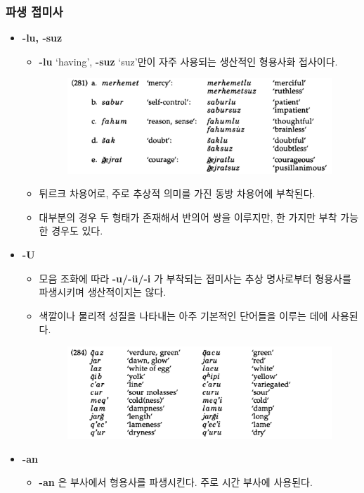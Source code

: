 \subsubsection{파생 접미사}
\begin{itemize}
\item \textbf{-lu, -suz}
\begin{itemize}
\item \textbf{-lu} `having', \textbf{-suz} `suz'만이 자주 사용되는 생산적인 형용사화 접사이다.
\begin{figure}[H]
\centerline{\includegraphics[width=.8\linewidth]{Lezgian/src/ex281.png}}
\end{figure}
\item 튀르크 차용어로, 주로 추상적 의미를 가진 동방 차용어에 부착된다.
\item 대부분의 경우 두 형태가 존재해서 반의어 쌍을 이루지만, 한 가지만 부착 가능한 경우도 있다.
\end{itemize}
\item \textbf{-U}
\begin{itemize}
\item 모음 조화에 따라 \textbf{-u/-ü/-i} 가 부착되는 접미사는 추상 명사로부터 형용사를 파생시키며 생산적이지는 않다.
\item 색깔이나 물리적 성질을 나타내는 아주 기본적인 단어들을 이루는 데에 사용된다.
\begin{figure}[H]
\centerline{\includegraphics[width=.8\linewidth]{Lezgian/src/ex284.png}}
\end{figure}
\end{itemize}
\item \textbf{-an}
\begin{itemize}
\item \textbf{-an} 은 부사에서 형용사를 파생시킨다. 주로 시간 부사에 사용된다.

\end{itemize}
\end{itemize}
